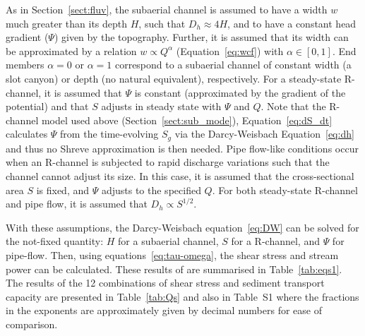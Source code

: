 \documentclass[tc, manuscript]{copernicus}
\begin{document}
As in Section~\ref{sect:fluv}, the subaerial channel is assumed to have a width $w$ much greater than its depth $H$, such that $D_h\approx 4H$, and to have a constant head gradient ($\Psi$) given by the topography.
Further, it is assumed that its width can be approximated by a relation $w \propto Q^\alpha$ (Equation~\ref{eq:wcf}) with $\alpha\in [0,1]$.
End members $\alpha=0$ or $\alpha=1$ correspond to a subaerial channel of constant width (a slot canyon) or depth (no natural equivalent), respectively.
% 
For a steady-state R-channel, it is assumed that  $\Psi$ is constant (approximated by the gradient of the \citet{shreve1972} potential) and that $S$ adjusts in steady state with $\Psi$ and $Q$.
Note that the R-channel model used above (Section~\ref{sect:sub_mode}), Equation~\ref{eq:dS_dt} calculates $\Psi$ from the time-evolving $S_g$ via the Darcy-Weisbach Equation~\ref{eq:dh} and thus no Shreve approximation is then needed.
% 
Pipe flow-like conditions occur when an R-channel is subjected to rapid discharge variations such that the channel cannot adjust its size.
In this case, it is assumed that the cross-sectional area $S$ is fixed, and $\Psi$ adjusts to the specified $Q$.
For both steady-state R-channel and pipe flow, it is assumed that $D_h \propto S^{1/2}$.

With these assumptions, the Darcy-Weisbach equation~\eqref{eq:DW} can be solved for the not-fixed quantity: $H$ for a subaerial channel, $S$ for a R-channel, and $\Psi$ for pipe-flow.
Then, using equations~\eqref{eq:tau-omega}, the shear stress and stream power can be calculated.
These results of are summarised in Table~\ref{tab:eqs1}.
The results of the 12 combinations of shear stress and sediment transport capacity are presented in Table~\ref{tab:Qs} and also in Table~S1 where the fractions in the exponents are approximately given by decimal numbers for ease of comparison.
\end{document}
